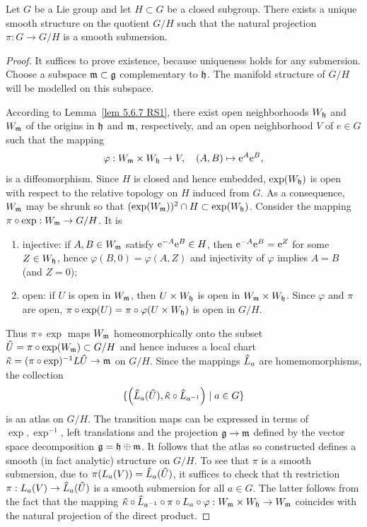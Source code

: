 \begin{thm}
    Let $G$ be a Lie group and let $H\subset G$ be a closed subgroup. There exists a unique smooth structure on the quotient $G\slash H$ such that the natural projection $\pi:G\to G\slash H$ is a smooth submersion.
\end{thm}
\begin{proof}
    It suffices to prove existence, because uniqueness holds for any submersion. Choose a subspace $\mathfrak{m}\subset \mathfrak{g}$ complementary to $\mathfrak{h}$. The manifold structure of $G\slash H$ will be modelled on this subspace.

    According to Lemma~\ref{lem 5.6.7 RS1}, there exist open neighborhoods $W_{\mathfrak{h}}$ and $W_{\mathfrak{m}}$ of the origins in $\mathfrak{h}$ and $\mathfrak{m}$, respectively, and an open neighborhood $V$ of $e\in G$ such that the mapping
    \[\varphi:W_{\mathfrak{m}}\times W_{\mathfrak{h}}\to V,\quad (A,B)\mapsto \mathrm{e}^A \mathrm{e}^B,\]
    is a diffeomorphism. Since $H$ is closed and hence embedded, $\exp (W_{\mathfrak{h}})$ is open with respect to the relative topology on $H$ induced from $G$. As a consequence, $W_{\mathfrak{m}}$ may be shrunk so that $(\exp(W_{\mathfrak{m}}))^2\cap H\subset \exp(W_{\mathfrak{h}})$. Consider the mapping $\pi\circ \exp:W_{\mathfrak{m}}\to G\slash H$. It is
    \begin{enumerate}[label=(\alph*)]
        \item injective: if $A,B\in W_{\mathfrak{m}}$ satisfy $\mathrm{e}^{-A}\mathrm{e}^B\in H$, then $\mathrm{e}^{-A}\mathrm{e}^B=\mathrm{e}^Z$ for some $Z\in W_{\mathfrak{h}}$, hence $\varphi(B,0)=\varphi(A,Z)$ and injectivity of $\varphi$ implies $A=B$ (and $Z=0$);
        \item open: if $U$ is open in $W_{\mathfrak{m}}$, then $U\times W_{\mathfrak{h}}$ is open in $W_{\mathfrak{m}}\times W_{\mathfrak{h}}$. Since $\varphi$ and $\pi$ are open, $\pi\circ\exp(U)=\pi\circ\varphi(U\times W_{\mathfrak{h}})$ is open in $G\slash H$.
    \end{enumerate}
    Thus $\pi\circ\exp$ maps $W_{\mathfrak{m}}$ homeomorphically onto the subset $\wh{U}=\pi\circ\exp(W_\frakm)\subset G\slash H$ and hence induces a local chart $\wh{\kappa}=(\pi\circ\exp)^{-1}L\wh{U}\to \frakm$ on $G\slash H$. Since the mappings $\wh{L}_a$ are homemomorphisms, the collection
    \[\{\left(\wh{L}_a(\wh{U}),\wh{\kappa}\circ \wh{L}_{a^{-1}}\right)\mid a\in G\}\]
    is an atlas on $G\slash H$. The transition maps can be expressed in terms of $\exp,\exp^{-1}$, left translations and the projection $\mathfrak{g}\to\mathfrak{m}$ defined by the vector space decomposition $\mathfrak{g}=\mathfrak{h}\oplus\mathfrak{m}$. It follows that the atlas so constructed defines a smooth (in fact analytic) structure on $G\slash H$. To see that $\pi$ is a smooth submersion, due to $\pi(L_a(V))=\wh{L}_a(\wh{U})$, it suffices to check that th restriction $\pi:L_a(V)\to \wh{L}_a(\wh{U})$ is a smooth submersion for all $a\in G$. The latter follows from the fact that the mapping $\wh{\kappa}\circ\wh{L}_{a^{-1}}\circ\pi\circ L_a\circ\varphi:W_\frakm\times W_\frakh\to W_\frakm$ coincides with the natural projection of the direct product.
\end{proof}



